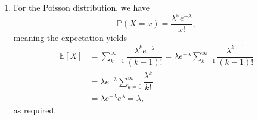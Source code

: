 \documentclass[12pt]{article}
\begin{document}
\begin{enumerate}
\begin{enumerate}
        Hence, we have
        $$
        \text{Var}(X) = np + n(n-1)p^2 - n^2 p^2 = np -np^2 = np(1-p)
        $$
        as required.
      \item For the Poisson distribution, we have
        $$
        \mathbb P(X = x) = \dfrac{\lambda^x e^{-\lambda}}{x!},
        $$
        meaning the expectation yields
        \begin{align*}
          \mathbb E[X] &= \sum_{k = 1}^{\infty} \dfrac{\lambda^k
          e^{-\lambda}}{(k-1)!} = \lambda e^{-\lambda} \sum_{k =
          1}^{\infty} \dfrac{\lambda^{k-1}}{(k-1)!} \\
          &= \lambda e^{-\lambda} \sum_{k = 0}^{\infty} \dfrac{\lambda^k}{k!} \\
          &= \lambda e^{-\lambda} e^{\lambda} = \lambda,
        \end{align*}
        as required.


\end{enumerate}
\end{enumerate}
\end{document}
